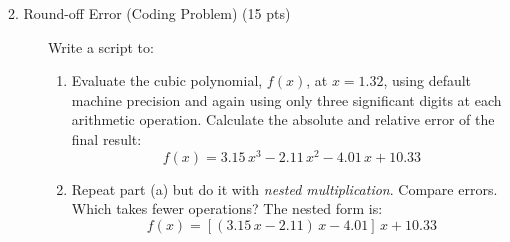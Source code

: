 \documentclass[12pt]{article}
\begin{document}
\begin{description}
\item[2. Round-off Error \color{red} (Coding Problem) \color{black} (15 pts)] Write a script to:
\begin{enumerate}[label=\textbf{(\alph*)}]
\item Evaluate the cubic polynomial, $f (x)$, at $x = 1.32$, using default machine precision and again using only three significant digits at each arithmetic operation. Calculate the absolute and relative error of the final result:
    \begin{equation*}
        f (x) = 3.15 \, x^3 - 2.11 \, x^2 - 4.01 \, x + 10.33
    \end{equation*}
    \item Repeat part (a) but do it with \emph{nested multiplication}. Compare errors. Which takes fewer operations? The nested form is:
    \begin{equation*}
        f (x) = [(3.15 \, x - 2.11) \, x - 4.01] \, x + 10.33
    \end{equation*}
    \end{enumerate}
    

\end{description}
\end{document}
